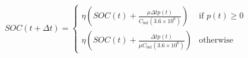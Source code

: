 \begin{equation}
	SOC(t+\Delta t) =
	\begin{cases}
		\eta \left(SOC(t) + \frac{\mu \Delta t p(t)}{C_{bat}(3.6\times10^6)}\right) &\text{if } p(t) \geq 0\\
		\eta \left(SOC(t) + \frac{\Delta t p(t)}{\mu C_{bat}(3.6\times10^6)}\right) &\text{otherwise}
	\end{cases}
	\label{ch2:equ:battery-model-equation}
\end{equation}